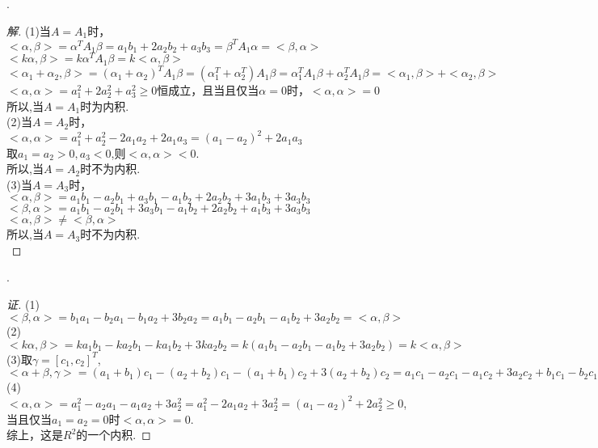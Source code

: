 \documentclass[10pt,a4paper]{report}
\begin{document}
.
\begin{proof}[解]
	(1)当$A=A_{1}$时，\\
	$<\alpha,\beta> = \alpha^{T}A_{1}\beta = a_{1}b_{1}+2a_{2}b_{2}+a_{3}b_{3} = \beta^{T}A_{1}\alpha = <\beta, \alpha>$\\
	$<k\alpha, \beta> = k\alpha^{T}A_{1}\beta = k<\alpha,\beta>$\\
	$<\alpha_{1} + \alpha_{2}, \beta> = (\alpha_{1} + \alpha_{2})^{T}A_{1}\beta = (\alpha_{1}^{T} + \alpha_{2}^{T})A_{1}\beta = \alpha_{1}^{T}A_{1}\beta + \alpha_{2}^{T}A_{1}\beta = <\alpha_{1}, \beta>+<\alpha_{2}, \beta>$\\
	$<\alpha, \alpha> = a_{1}^{2}+2a_{2}^{2}+a_{3}^{2} \geq 0$恒成立，且当且仅当$\alpha = 0$时，$<\alpha,\alpha> = 0$\\
	所以,当$A=A_{1}$时为内积.\\
	(2)当$A=A_{2}$时，\\
	$<\alpha,\alpha> = a_{1}^{2}+a_{2}^{2} - 2a_{1}a_{2}+2a_{1}a_{3} = (a_{1}-a_{2})^{2}+2a_{1}a_{3}$\\
	取$a_{1} = a_{2} > 0, a_{3} < 0$,则$<\alpha,\alpha> < 0$.\\
	所以,当$A=A_{2}$时不为内积.\\
	(3)当$A=A_{3}$时，\\
	$<\alpha, \beta> = a_{1}b_{1}-a_{2}b_{1}+a_{3}b_{1}-a_{1}b_{2}+2a_{2}b_{2}+3a_{1}b_{3}+3a_{3}b_{3}$\\
	$<\beta, \alpha> = a_{1}b_{1}-a_{2}b_{1}+3a_{3}b_{1} -a_{1}b_{2}+2a_{2}b_{2}+a_{1}b_{3}+3a_{3}b_{3}$\\
	$<\alpha, \beta> \neq <\beta, \alpha>$\\
	所以,当$A=A_{3}$时不为内积.\\
\end{proof}
.
\begin{proof}[证]
	(1)$<\beta, \alpha> = b_{1}a_{1} - b_{2}a_{1}-b_{1}a_{2}+3b_{2}a_{2} = a_{1}b_{1}-a_{2}b_{1}-a_{1}b_{2}+3a_{2}b_{2} = <\alpha, \beta>$\\
	(2)$<k\alpha, \beta> = ka_{1}b_{1}-ka_{2}b_{1}-ka_{1}b_{2}+3ka_{2}b_{2} = k(a_{1}b_{1}-a_{2}b_{1}-a_{1}b_{2}+3a_{2}b_{2}) = k<\alpha, \beta>$\\
	(3)取$\gamma = [c_{1},c_{2}]^{T}$, $<\alpha+\beta, \gamma> = (a_{1}+b_{1})c_{1}-(a_{2}+b_{2})c_{1}-(a_{1}+b_{1})c_{2}+3(a_{2}+b_{2})c_{2} =a_{1}c_{1}-a_{2}c_{1}-a_{1}c_{2}+3a_{2}c_{2} + b_{1}c_{1}-b_{2}c_{1}-b_{1}c_{2}+3b_{2}c_{2} = <\alpha, \gamma> + <\beta, \gamma>$\\
	(4)$<\alpha, \alpha> = a_{1}^{2}-a_{2}a_{1}-a_{1}a_{2}+3a_{2}^{2} = a_{1}^{2}-2a_{1}a_{2}+3a_{2}^{2} = (a_{1}-a_{2})^{2}+2a_{2}^{2} \geq 0$,当且仅当$a_{1} = a_{2} = 0$时$<\alpha, \alpha> = 0$.\\
	综上，这是$R^{2}$的一个内积.
\end{proof}
\end{document}

